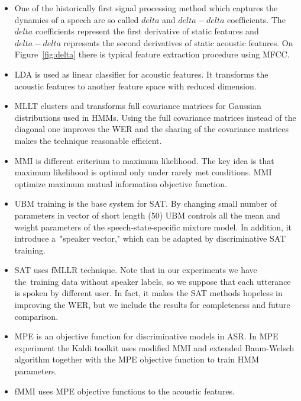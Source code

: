 \begin{itemize}
    \item One of the historically first signal processing method which captures the dynamics of a speech
        are so called $delta$ and $delta-delta$ coefficients. The~$delta$ coefficients represent the first 
        derivative of static features and $delta-delta$ represents the second derivatives of static acoustic features.
        On Figure~\ref{fig:delta} there is typical feature extraction procedure using \ac{MFCC}\cite{ye2004speech}.
    \item \ac{LDA} is used as linear classifier for acoustic features. 
        It transforms the acoustic features to another feature space with reduced dimension.
    \item \ac{MLLT}\cite{psutka2007benefit} clusters and transforms full covariance matrices for Gaussian distributions used in \ac{HMM}s. Using the full covariance matrices instead of the diagonal one improves the \ac{WER} and the sharing of the covariance matrices makes the technique reasonable efficient.
    \item \ac{MMI} is different criterium to maximum likelihood. The key idea is that maximum likelihood is optimal only under rarely met conditions. \ac{MMI} optimize maximum mutual information objective function\cite{chow1990maximum}.
    \item \ac{UBM}\cite{povey2010subspace} training is the base system for \acl{SAT}. 
        By changing small number of parameters in vector of short length (50) \ac{UBM} controls all the mean and 
        weight parameters of the speech-state-specific mixture model. In addition, it introduce 
        a~"speaker vector," which can be adapted by discriminative \ac{SAT} training.
    \item \acl{SAT}\cite{povey2011kaldi} uses \ac{fMLLR} technique. Note that in our experiments we have 
        the~training data without speaker labels, so we suppose that each utterance is spoken by different user.
        In fact, it makes the \ac{SAT} methods hopeless in improving the \ac{WER}, 
        but we include the results for completeness and future comparison.
    \item \ac{MPE}\cite{povey2007evaluation} is an objective function for discriminative models in \ac{ASR}. In \ac{MPE} experiment the Kaldi toolkit uses modified \ac{MMI} and extended Baum-Welsch algorithm together with the \ac{MPE} objective function to train \ac{HMM} parameters.
    \item \cite{povey2005fmpe} \ac{fMMI} uses \ac{MPE} objective functions to the acoustic features.
\end{itemize}
